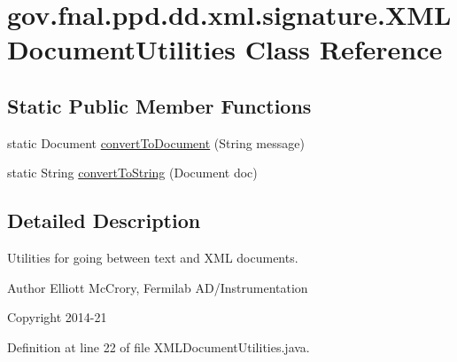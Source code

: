 \hypertarget{classgov_1_1fnal_1_1ppd_1_1dd_1_1xml_1_1signature_1_1XMLDocumentUtilities}{\section{gov.\-fnal.\-ppd.\-dd.\-xml.\-signature.\-X\-M\-L\-Document\-Utilities Class Reference}
\label{classgov_1_1fnal_1_1ppd_1_1dd_1_1xml_1_1signature_1_1XMLDocumentUtilities}
}
\subsection*{Static Public Member Functions}
\begin{DoxyCompactItemize}
\item 
static Document \hyperlink{classgov_1_1fnal_1_1ppd_1_1dd_1_1xml_1_1signature_1_1XMLDocumentUtilities_a5113e903c8c8049153bc4b3d6c43da1a}{convert\-To\-Document} (String message)
\item 
static String \hyperlink{classgov_1_1fnal_1_1ppd_1_1dd_1_1xml_1_1signature_1_1XMLDocumentUtilities_a9eed59a958a4e4e56f1b7dcc904cbc90}{convert\-To\-String} (Document doc)
\end{DoxyCompactItemize}


\subsection{Detailed Description}
Utilities for going between text and X\-M\-L documents.

\begin{DoxyAuthor}{Author}
Elliott Mc\-Crory, Fermilab A\-D/\-Instrumentation 
\end{DoxyAuthor}
\begin{DoxyCopyright}{Copyright}
2014-\/21 
\end{DoxyCopyright}


Definition at line 22 of file X\-M\-L\-Document\-Utilities.\-java.



